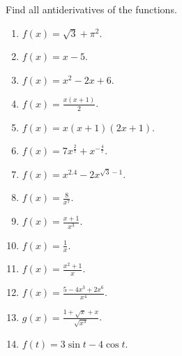 Find all antiderivatives of the functions.
\begin{multicols}{3}
\begin{enumerate}
\item $\displaystyle f(x)=\sqrt {3}+\pi^2$.

\item $\displaystyle f(x)=x-5$.


\item $\displaystyle f(x)= x^2-2x+6$.


\item $\displaystyle f(x)=\frac{x(x+1)}{2} $.

\item $\displaystyle f(x)=x(x+1)(2x+1)$.

\item $\displaystyle f(x)=7x^{\frac{2}{7}}+x^{-\frac{4}{7}}$.

\item $\displaystyle f(x)=x^{2.4}-2x^{\sqrt{3}-1}$.

\item $\displaystyle f(x)=\frac{8}{x^7}$.

\item $\displaystyle f(x)=\frac{x+1}{x^3}$.

\item $\displaystyle f(x)=\frac{1}{x}$.

\item $\displaystyle f(x)=\frac{x^2+1}{x}$.

\item $\displaystyle f(x)=\frac{5-4x^3+2x^6}{x^4}$.

\item $\displaystyle g(x)=\frac{1+\sqrt{x}+x}{\sqrt{x^3}}$.

\item $\displaystyle f(t)=3\sin t-4\cos t$.


\end{enumerate}
\end{multicols}
